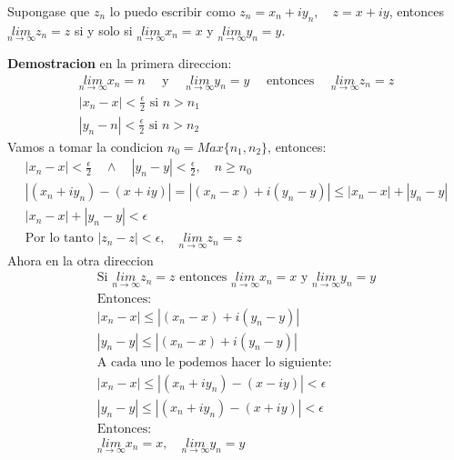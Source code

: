 \documentclass{article}
\newcommand{\caja}[3]{%
  \begin{tcolorbox}[colback=#1!5!white,colframe=#1!25!black,title=#2]
    #3
  \end{tcolorbox}%
}
\begin{document}
\caja{green}{Teorema }{
  Supongase que $ z_n  $ lo puedo escribir como $ z_n = x_n + i y_n, \quad z = x+ iy  $, entonces $ \underset{n \rightarrow \infty}{lim }z_n = z  $ si y solo si $ \underset{n \rightarrow \infty}{lim }x_n  = x  $ y $ \underset{n \rightarrow  \infty}{lim }y_n  = y  $.
}
\textbf{Demostracion } en la primera direccion: 
\begin{gather}
  \underset{n \rightarrow  \infty}{lim } x_n = n \quad \text{ y }\quad \underset{n \rightarrow  \infty}{lim } y_n = y \quad \text{ entonces }\quad \underset{n \rightarrow  \infty}{lim }z_n = z \\
  \left|x_n - x \right| < \frac{\epsilon}{2} \text{ si } n>n_1 \\
  \left|y_n - n \right|<\frac{\epsilon}{2} \text{ si } n>n_2 
\end{gather}
Vamos a tomar la condicion $ n_0 = Max\{n_1,n_2\}  $, entonces: 
\begin{gather}
  \left|x_n - x \right|<\frac{\epsilon}{2} \quad \wedge \quad \left|y_n - y \right| < \frac{\epsilon}{2}, \quad n\geq n_0 \\
  \left|(x_n + i y_n ) - (x+ i y)\right| = \left|(x_n-x) + i (y_n-y )\right|\leq \left|x_n - x \right| + \left|y_n - y \right|\\
  \left|x_n - x \right|+ \left|y_n - y \right|<\epsilon \\
  \text{Por lo tanto } \left|z_n - z \right|< \epsilon, \quad \underset{n \rightarrow \infty}{lim }z_n  = z
\end{gather}
Ahora en la otra direccion 
\begin{gather}
  \text{Si }\underset{n \rightarrow \infty}{lim }z_n = z \text{ entonces } \underset{n \rightarrow \infty}{lim }x_n  = x \text{ y }\underset{n \rightarrow \infty}{lim }y_n = y \\
  \text{Entonces: }\\
  \left|x_n - x \right|\leq \left|(x_n - x ) + i (y_n - y )\right|\\
  \left|y_n - y \right|\leq \left|(x_n - x ) + i (y_n - y )\right|\\
  \text{A cada uno le podemos hacer lo siguiente: }\\
  \left|x_n - x \right|\leq \left|(x_n + i y_n )- (x-iy )\right|<\epsilon\\
  \left|y_n - y \right|\leq \left|(x_n + i y_n) - (x+ i y)\right|<\epsilon\\
  \text{Entonces: }\\
  \underset{n \rightarrow \infty}{lim }x_n = x, \quad \underset{n \rightarrow \infty}{lim }y_n  = y 
\end{gather}
\end{document}
